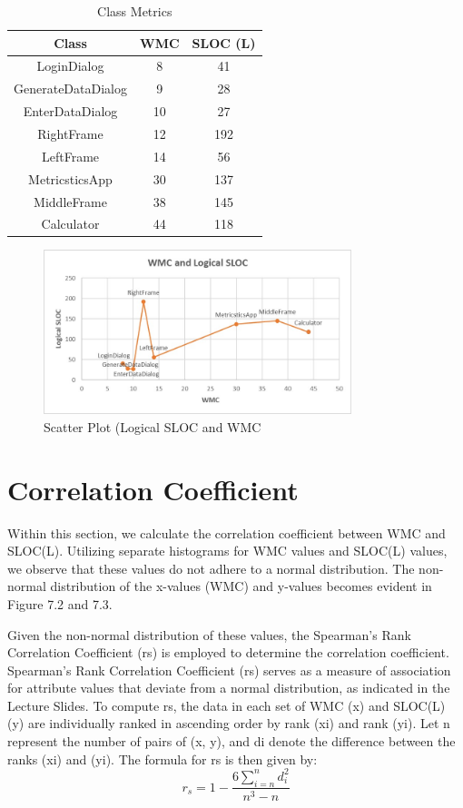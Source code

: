 \documentclass[english,12pt,a4paper]{report}
\begin{document}
	\begin{table}[htbp]
		\centering
		
		\begin{tabular}{|c|c|c|}
			\hline
			\textbf{Class} & \textbf{WMC} & \textbf{SLOC (L)} \\
			\hline
			LoginDialog & 8 & 41 \\
			\hline
			GenerateDataDialog & 9 & 28 \\
			\hline
			EnterDataDialog & 10 & 27 \\
			\hline
			RightFrame	& 12 & 192 \\
			\hline
			LeftFrame & 14 & 56 \\
			\hline
			MetricsticsApp & 30 & 137 \\
			\hline
			MiddleFrame	 & 38 & 145 \\
			\hline
			Calculator	& 44 & 118 \\
			\hline
		\end{tabular}
		\caption{Class Metrics}
	\end{table}
		\begin{figure}[h]
		\centering
		\includegraphics[width=0.8\textwidth]{images/ScatterPlot.png}
		\caption{Scatter Plot (Logical SLOC and WMC}
		\label{fig:Scatter Plot (Logical SLOC and WMC}
		\end{figure}
	
	\section{Correlation Coefficient}
	Within this section, we calculate the correlation coefficient between WMC and SLOC(L). Utilizing separate histograms for WMC values and SLOC(L) values, we observe that these values do not adhere to a normal distribution. The non-normal distribution of the x-values (WMC) and y-values becomes evident in Figure 7.2 and 7.3.
	
	Given the non-normal distribution of these values, the Spearman’s Rank Correlation Coefficient (rs) is employed to determine the correlation coefficient. Spearman’s Rank Correlation Coefficient (rs) serves as a measure of association for attribute values that deviate from a normal distribution, as indicated in the Lecture Slides. To compute rs, the data in each set of WMC (x) and SLOC(L) (y) are individually ranked in ascending order by rank (xi) and rank (yi). Let n represent the number of pairs of (x, y), and di denote the difference between the ranks (xi) and (yi). The formula for rs is then given by:
	\[ r_{s} = 1 - \frac{6\sum_{i=n}^{n}{d^{2}_i}}{n^{3}-n} \]\\
	
\end{document}
